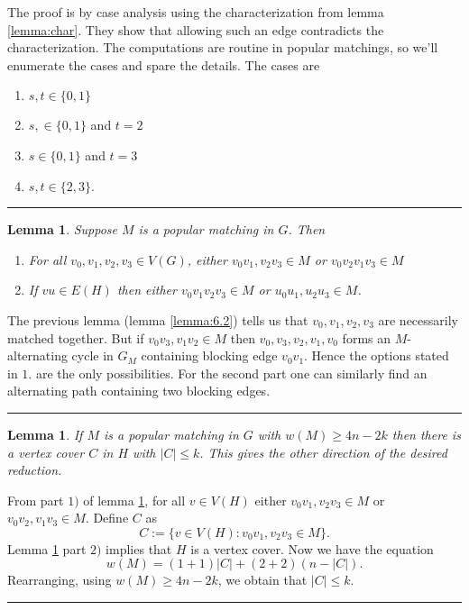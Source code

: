 \documentclass[letterpaper,12pt,oneside,onecolumn]{article}
\newenvironment{proof}{{\bf Proof:  }}{\hfill\rule{2mm}{2mm}}
\newtheorem{lemma}[fact]{Lemma}
\begin{document}
\begin{proof}
The proof is by case analysis using the characterization from lemma \ref{lemma:char}. They show that allowing such an edge contradicts the characterization. The computations are routine in popular matchings, so we'll enumerate the cases and spare the details. The cases are
\begin{enumerate}
\item $s,t \in \{0,1\}$
\item $s, \in \{0,1\}$ and $t=2$
\item $s \in \{0,1\}$ and $t=3$
\item $s,t \in\{2,3\}$.
\end{enumerate}
\end{proof}
\begin{lemma}\label{lemma:6.3}
Suppose $M$ is a popular matching in $G$. Then 
\begin{enumerate}
\item For all $v_0,v_1,v_2,v_3 \in V(G)$, either $v_0v_1,v_2v_3 \in M$ or $v_0v_2v_1v_3 \in M$
\item If $vu \in E(H)$ then either $v_0v_1 v_2v_3 \in M$ or $u_0u_1, u_2u_3 \in M$.
\end{enumerate}
\end{lemma}
\begin{proof}
The previous lemma (lemma \ref{lemma:6.2}) tells us that $v_0,v_1,v_2,v_3$ are necessarily matched together. But if $v_0v_3, v_1v_2 \in M$ then $v_0,v_3,v_2,v_1,v_0$ forms an $M$-alternating cycle in $G_M$ containing blocking edge $v_0v_1$. Hence the options stated in $1.$ are the only possibilities. For the second part one can similarly find an alternating path containing two blocking edges.
\end{proof}
\begin{lemma}\label{lemma:secondreduc}
If $M$ is a popular matching in $G$ with $w(M) \geq 4n-2k$ then there is a vertex cover $C$ in $H$ with $|C| \leq k$. This gives the other direction of the desired reduction.
\end{lemma}
\begin{proof}
From part $1)$ of lemma \ref{lemma:6.3}, for all $v \in V(H)$ either $v_0v_1, v_2v_3 \in M$ or $v_0v_2,v_1v_3 \in M$. Define $C$ as
$$C := \{ v \in V(H): v_0v_1, v_2v_3 \in M\}.$$
Lemma \ref{lemma:6.3} part $2)$ implies that $H$ is a vertex cover. Now we have the equation
$$w(M) = (1+1)|C| + (2+2)(n-|C|).$$
Rearranging, using $w(M) \geq 4n-2k$,  we obtain that $|C| \leq k$.
\end{proof}
\end{document}
